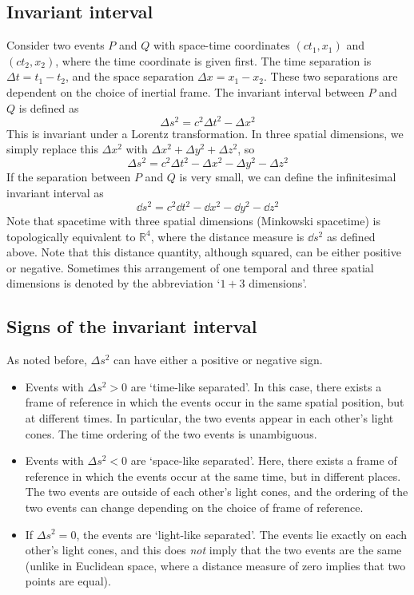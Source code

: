 \subsection{Invariant interval}
Consider two events \(P\) and \(Q\) with space-time coordinates \((ct_1, x_1)\) and \((ct_2, x_2)\), where the time coordinate is given first.
The time separation is \(\Delta t = t_1 - t_2\), and the space separation \(\Delta x = x_1 - x_2\).
These two separations are dependent on the choice of inertial frame.
The invariant interval between \(P\) and \(Q\) is defined as
\[
	\Delta s^2 = c^2 \Delta t^2 - \Delta x^2
\]
This is invariant under a Lorentz transformation.
In three spatial dimensions, we simply replace this \(\Delta x^2\) with \(\Delta x^2 + \Delta y^2 + \Delta z^2\), so
\[
	\Delta s^2 = c^2 \Delta t^2 - \Delta x^2 - \Delta y^2 - \Delta z^2
\]
If the separation between \(P\) and \(Q\) is very small, we can define the infinitesimal invariant interval as
\[
	\dd{s}^2 = c^2\dd{t}^2 - \dd{x}^2 - \dd{y}^2 - \dd{z}^2
\]
Note that spacetime with three spatial dimensions (Minkowski spacetime) is topologically equivalent to \(\mathbb R^4\), where the distance measure is \(\dd{s}^2\) as defined above.
Note that this distance quantity, although squared, can be either positive or negative.
Sometimes this arrangement of one temporal and three spatial dimensions is denoted by the abbreviation `\(1+3\) dimensions'.

\subsection{Signs of the invariant interval}
As noted before, \(\Delta s^2\) can have either a positive or negative sign.
\begin{itemize}
	\item Events with \(\Delta s^2 > 0\) are `time-like separated'.
	      In this case, there exists a frame of reference in which the events occur in the same spatial position, but at different times.
	      In particular, the two events appear in each other's light cones.
	      The time ordering of the two events is unambiguous.
	\item Events with \(\Delta s^2 < 0\) are `space-like separated'.
	      Here, there exists a frame of reference in which the events occur at the same time, but in different places.
	      The two events are outside of each other's light cones, and the ordering of the two events can change depending on the choice of frame of reference.
	\item If \(\Delta s^2 = 0\), the events are `light-like separated'.
	      The events lie exactly on each other's light cones, and this does \textit{not} imply that the two events are the same (unlike in Euclidean space, where a distance measure of zero implies that two points are equal).
\end{itemize}

